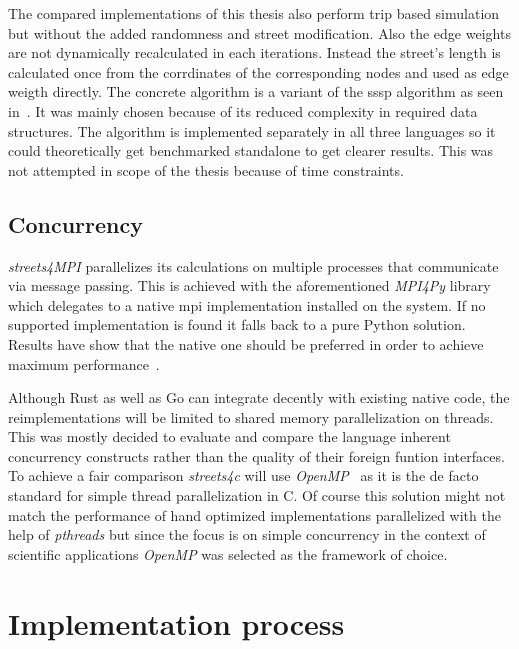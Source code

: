 The compared implementations of this thesis also perform trip based simulation but without the added randomness and street modification. Also the edge weights are not dynamically recalculated in each iterations. Instead the street's length is calculated once from the corrdinates of the corresponding nodes and used as edge weigth directly. The concrete algorithm is a variant of the  \gls{sssp} algorithm as seen in~\cite[p. 16]{dijkstra_utcs}. It was mainly chosen because of its reduced complexity in required data structures. The algorithm is implemented separately in all three languages so it could theoretically get benchmarked standalone to get clearer results. This was not attempted in scope of the thesis because of time constraints.

\subsection*{Concurrency}
\label{subsec:Concept::Differences::Concurrency}

\textit{streets4MPI} parallelizes its calculations on multiple processes that communicate via message passing. This is achieved with the aforementioned \textit{MPI4Py} library which delegates to a native \gls{mpi} implementation installed on the system. If no supported implementation is found it falls back to a pure Python solution. Results have show that the native one should be preferred in order to achieve maximum performance~\cite{streets_report}.

Although Rust as well as Go can integrate decently with existing native code, the reimplementations will be limited to shared memory parallelization on threads. This was mostly decided to evaluate and compare the language inherent concurrency constructs rather than the quality of their foreign funtion interfaces. To achieve a fair comparison \textit{streets4c} will use \textit{OpenMP}~ as it is the de facto standard for simple thread parallelization in C. Of course this solution might not match the performance of hand optimized implementations parallelized with the help of \textit{pthreads} but since the focus is on simple concurrency in the context of scientific applications \textit{OpenMP} was selected as the framework of choice.

\section{Implementation process}
\label{sec:Concept::Implementation}


